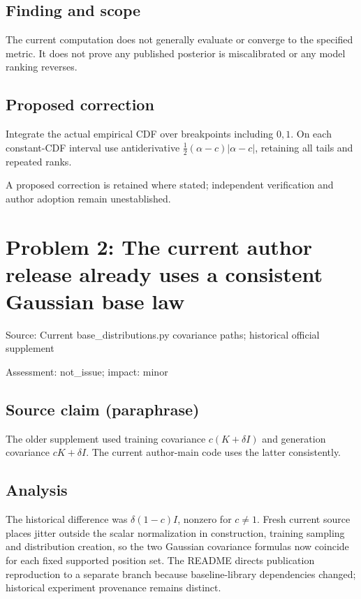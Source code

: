 \documentclass[11pt]{article}
\begin{document}
\subsection*{Finding and scope}

The current computation does not generally evaluate or converge to the specified metric. It does not prove any published posterior is miscalibrated or any model ranking reverses.

\subsection*{Proposed correction}

Integrate the actual empirical CDF over breakpoints including \(0,1\). On each constant-CDF interval use antiderivative \(\tfrac12(\alpha-c)|\alpha-c|\), retaining all tails and repeated ranks.

A proposed correction is retained where stated; independent verification and author adoption remain unestablished.

\section*{Problem 2: The current author release already uses a consistent Gaussian base law}

Source: Current base\_distributions.py covariance paths; historical official supplement

Assessment: not\_issue; impact: minor

\subsection*{Source claim (paraphrase)}

The older supplement used training covariance \(c(K+\delta I)\) and generation covariance \(cK+\delta I\). The current author-main code uses the latter consistently.

\subsection*{Analysis}

The historical difference was \(\delta(1-c)I\), nonzero for \(c\ne1\). Fresh current source places jitter outside the scalar normalization in construction, training sampling and distribution creation, so the two Gaussian covariance formulas now coincide for each fixed supported position set. The README directs publication reproduction to a separate branch because baseline-library dependencies changed; historical experiment provenance remains distinct.
\end{document}
